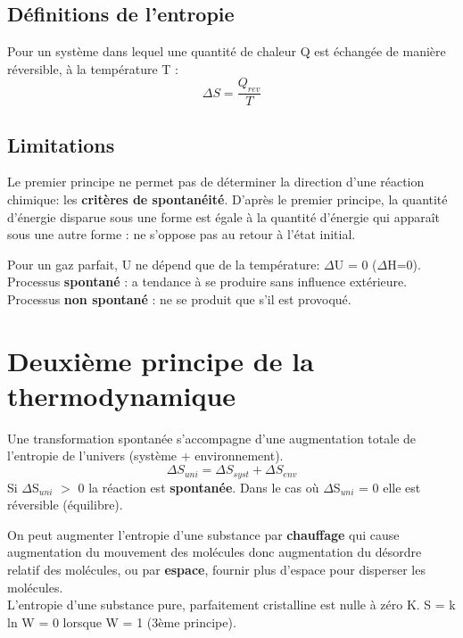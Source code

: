 \documentclass[10pt,a4paper]{book}
\begin{document}
\subsection{Définitions de l’entropie}

Pour un système dans lequel une quantité de chaleur Q est échangée de manière réversible, à la température T :
\begin{displaymath}
\Delta S = \frac{Q_{rev}}{T}
\end{displaymath}
\subsection{Limitations}

Le premier principe ne permet pas de déterminer la direction d’une réaction chimique: les \textbf{critères de spontanéité}. D’après le premier principe, la quantité d’énergie disparue sous une forme est égale à la quantité d’énergie qui apparaît sous une autre forme : ne s’oppose pas au retour à l’état initial. \par
Pour un gaz parfait, U ne dépend que de la température: $\Delta$U = 0 ($\Delta$H=0). \\
Processus \textbf{spontané} : a tendance à se produire sans influence extérieure. \\
Processus \textbf{non spontané} : ne se produit que s’il est provoqué.

\section{Deuxième principe de la thermodynamique}

Une transformation spontanée s’accompagne d’une augmentation totale de l’entropie de l’univers (système + environnement).
\begin{displaymath}
\Delta S_{uni} = \Delta S_{syst} + \Delta S_{env}  
\end{displaymath}
Si $\Delta$S$_{uni}$ $>$ 0 la réaction est \textbf{spontanée}. Dans le cas où $\Delta$S$_{uni}$ = 0 elle est réversible (équilibre). \par
On peut augmenter l'entropie d'une substance par \textbf{chauffage} qui cause augmentation du mouvement des molécules donc augmentation du désordre relatif des molécules, ou par \textbf{espace}, fournir plus d’espace pour disperser les molécules. \\
L’entropie d’une substance pure, parfaitement cristalline est nulle à zéro K. S = k ln W = 0 lorsque W = 1 (3ème principe). %
\end{document}
